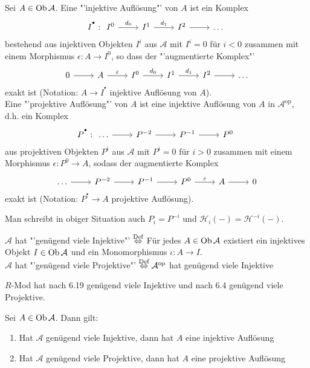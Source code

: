 \begin{df}
	Sei $A\in \text{Ob}\,\mathcal{A}$. Eine "'injektive Auflösung"' von $A$ ist ein Komplex 
	$$I^{^\bullet}: \begin{tikzcd}
	I^0\arrow{r}{d_0} & I^1 \arrow{r}{d_1}& I^2\arrow{r} & \ldots
	\end{tikzcd}$$
	bestehend aus injektiven Objekten $I^i$ aus $\mathcal{A}$ mit $I^i=0$ für $i<0$ zusammen mit einem Morphismus $\epsilon : A\longrightarrow I^0$, so dass der "'augmentierte Komplex"'
	$$\begin{tikzcd}
	0 \arrow{r}& A \arrow{r}{\epsilon} &I^0\arrow{r}{d_0} & I^1 \arrow{r}{d_1}& I^2\arrow{r} & \ldots
	\end{tikzcd}$$
	exakt ist (Notation: $A\longrightarrow I^{^\bullet}$ injektive Auflösung von $A$).\\
	Eine "'projektive Auflösung"' von $A$ ist eine injektive Auflösung von $A$ in $\mathcal{A}^\text{op}$, d.h. ein Komplex 
	$$P^{^\bullet}: \begin{tikzcd}
	\ldots \arrow{r} &P^{-2} \arrow{r} & P^{-1} \arrow{r} & P^0
	\end{tikzcd}$$
	aus projektiven Objekten $P^i$ aus $\mathcal{A}$ mit $P^i=0$ für $i>0$ zusammen mit einem Morphismus $\epsilon:P^0 \to A$, sodass der augmentierte Komplex
	$$\begin{tikzcd}
	\ldots \arrow{r} & P^{-2} \arrow{r} &P^{-1} \arrow{r} & P^0 \arrow{r}{\epsilon} & A \arrow{r} & 0
		\end{tikzcd}$$
	exakt ist (Notation: $P^{^\bullet} \longrightarrow A$ projektive Auflösung).
\end{df}
\begin{anm}
	Man schreibt in obiger Situation auch $P_i = P^{-i}$ und $\mathcal{H}_i(-) = \mathcal{H}^{-i}(-)$.
\end{anm}
\begin{df}
	$\mathcal{A}$ hat "'genügend viele Injektive"' $\overset{\text{Def}}{\Leftrightarrow}$ Für jedes $A\in \text{Ob}\,\mathcal{A}$ existiert ein injektives Objekt $I\in \text{Ob}\,\mathcal{A}$ und ein Monomorphismus $\iota:A \to I$.\\
	$\mathcal{A}$ hat "'genügend viele Projektive"' $\overset{\text{Def}}{\Leftrightarrow} \mathcal{A}^\text{op}$ hat genügend viele Injektive
\end{df}
\begin{bsp}
	$R$-Mod hat nach 6.19 genügend viele Injektive und nach 6.4 genügend viele Projektive.
\end{bsp}
\begin{bem}
	Sei $A\in \text{Ob}\,\mathcal{A}$. Dann gilt:
	\begin{enumerate}[label = \alph*)]
		\item Hat $\mathcal{A}$ genügend viele Injektive, dann hat $A$ eine injektive Auflösung
		\item Hat $\mathcal{A}$ genügend viele Projektive, dann hat $A$ eine projektive Auflösung
	\end{enumerate}
\end{bem}
